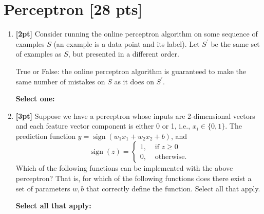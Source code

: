 \documentclass[12pt]{article}
\renewcommand{\circle}{\tikz\draw[black] (0,0) circle (1ex);}
\begin{document}
\section{Perceptron [28 pts]}
\begin{enumerate}
    \item \textbf{[2pt]} Consider running the online perceptron algorithm on some sequence of examples $S$ (an example is a data point and its label). Let $S^\prime$ be the same set of examples as $S$, but presented in a different order.
    
    True or False: the online perceptron algorithm is guaranteed to make the same number of mistakes on $S$ as it does on $S^\prime$.

    \textbf{Select one:}


    
    \item \textbf{[3pt]} Suppose we have a perceptron whose inputs are 2-dimensional vectors and each feature vector component is either 0 or 1, i.e., $x_i \in \{0,1\}$. The prediction function $y = \operatorname{sign}(w_1x_1 + w_2x_2 + b)$, and
    $$
    \operatorname{sign}(z) = 
    \begin{cases}
    1, & \textrm{ if } z \geq 0\\
    0, & \textrm{ otherwise}.
    \end{cases}
    $$
    Which of the following functions can be implemented with the above perceptron? That is, for which of the following functions does there exist a set of parameters $w,b$ that correctly define the function. Select all that apply.
    
    \textbf{Select all that apply:}


\end{enumerate}
\end{document}
